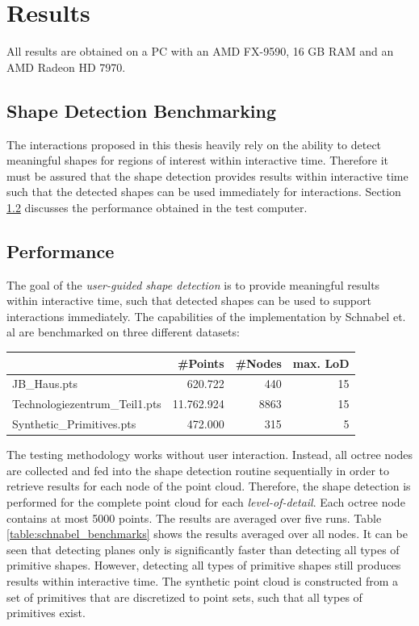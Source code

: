 \chapter{Results}
\label{chap:results}


All results are obtained on a PC with an AMD FX-9590, 16 GB RAM and an AMD Radeon HD 7970. 


\section{Shape Detection Benchmarking}

The interactions proposed in this thesis heavily rely on the ability to detect meaningful shapes for regions of interest within interactive time. Therefore it must be assured that the shape detection provides results within interactive time such that the detected shapes can be used immediately for interactions. Section \ref{sec:shapedetectionperformance} discusses the performance obtained in the test computer. 


\section{Performance}
\label{sec:shapedetectionperformance}

The goal of the \textit{user-guided shape detection} is to provide meaningful results within interactive time, such that detected shapes can be used to support interactions immediately. The capabilities of the implementation by Schnabel et. al\cite{schnabel-2007-software} are benchmarked on three different datasets: 

\begin{center}
\begin{tabular}{ l | r | r | r }

		& 										\textbf{\#Points} 				& \textbf{\#Nodes} 	& \textbf{max. LoD} \\
		\hline
  JB\_Haus.pts									& 620.722 								& 440 			& 15 \\
  Technologiezentrum\_Teil1.pts	& 11.762.924							& 8863 			& 15 \\
  Synthetic\_Primitives.pts 		& 472.000 								& 315	 			& 5 \\
	
\end{tabular}
\end{center}

The testing methodology works without user interaction. Instead, all octree nodes are collected and fed into the shape detection routine sequentially in order to retrieve results for each node of the point cloud. Therefore, the shape detection is performed for the complete point cloud for each \textit{level-of-detail}. Each octree node contains at most 5000 points. The results are averaged over five runs. Table \ref{table:schnabel_benchmarks} shows the results averaged over all nodes. It can be seen that detecting planes only is significantly faster than detecting all types of primitive shapes. However, detecting all types of primitive shapes still produces results within interactive time. The synthetic point cloud is constructed from a set of primitives that are discretized to point sets, such that all types of primitives exist. 

